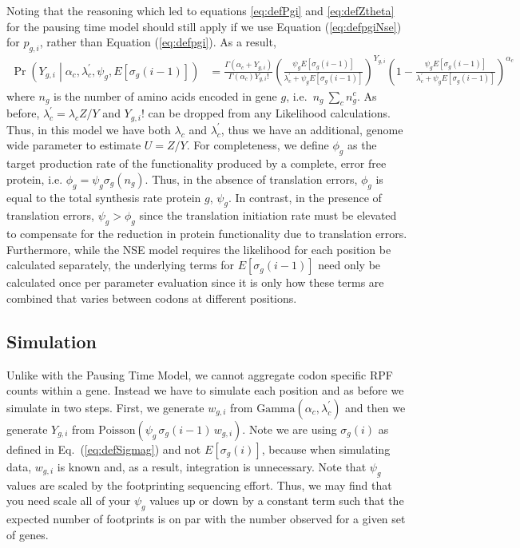 \documentclass{article}
\newcommand{\waitTerm}{\ensuremath{w}\xspace}
\newcommand{\wgi}{\ensuremath{\waitTerm_{g,i}}\xspace}
\newcommand{\WaitTerm}{\ensuremath{w}\xspace} %
\newcommand{\Wgi}{\ensuremath{\WaitTerm_{g,i}}\xspace}
\newcommand{\alphac}{\ensuremath{{\alpha_c}}\xspace}
\newcommand{\lambdac}{\ensuremath{{\lambda_c}}\xspace}
\newcommand{\lambdacprime}{\ensuremath{{\lambda_c^\prime}}\xspace}
\newcommand{\sigmag}{\ensuremath{\sigma_{g}}\xspace}
\newcommand{\sigmagi}{\ensuremath{\sigma_{g}(i)}\xspace}
\newcommand{\Esigmagi}{\ensuremath{E\left[\sigma_{g}(i)\right]}\xspace}
\newcommand{\Esigmagimone}{\ensuremath{E\left[\sigma_{g}(i-1)\right]}\xspace}
\newcommand{\pgi}{\ensuremath{{p_{g,i}}}\xspace}
\newcommand{\ngc}{\ensuremath{{n_{g}^c}}\xspace}
\renewcommand{\ng}{\ensuremath{{n_{g}}}\xspace}
\newcommand{\psig}{\ensuremath{{\psi_g}}\xspace}
\newcommand{\phig}{\ensuremath{{\phi_g}}\xspace}
\newcommand{\Ztheta}{\ensuremath{{Z}}\xspace}
\newcommand{\Ytotal}{\ensuremath{{Y}}\xspace}
\newcommand{\Ygi}{\ensuremath{{Y_{g,i}}}\xspace}
\begin{document}
Noting that the reasoning which led to equations \ref{eq:defPgi} and \ref{eq:defZtheta} for the pausing time model should still apply if we use Equation (\ref{eq:defpgiNse}) for \pgi, rather than Equation (\ref{eq:defpgi}). 
As a result,
\begin{align}
  \label{eq:distYgSiteNse}
  \Pr\left(\Ygi \middle| \alphac, \lambdacprime, \psig, \Esigmagimone\right) 
  &= \frac{\Gamma\left(\alphac + \Ygi\right)}{\Gamma\left(\alphac\right) \Ygi!} 
  \left(\frac{\psig \Esigmagimone}{\lambdacprime + \psig \Esigmagimone}\right)^\Ygi \left(1-\frac{\psig\Esigmagimone}{\lambdacprime + \psig \Esigmagimone}\right)^\alphac
\end{align}
where \ng is the number of amino acids encoded in gene $g$, i.e.~$\ng \ \sum_c \ngc$.
As before, $\lambdacprime = \lambdac \Ztheta/\Ytotal$ and $\Ygi!$ can be dropped from any Likelihood calculations.
Thus, in this model we have both $\lambdac$ and $\lambdacprime$, thus we have an additional, genome wide parameter to estimate $U = \Ztheta/\Ytotal$.
For completeness, we  define $\phig$ as the target production rate of the functionality produced by a complete, error free protein, i.e. $\phig = \psig \sigmag(\ng)$.
Thus, in the absence of translation errors, $\phig$ is equal to the total synthesis rate protein $g$, $\psig$.
In contrast, in the presence of translation errors, $\psig > \phig$ since the translation initiation rate must be elevated to compensate for the reduction in protein functionality due to translation errors.
Furthermore, while the NSE model requires the likelihood for each position be calculated separately, the underlying terms for $\Esigmagimone$ need only be calculated once per parameter evaluation since it is only how these terms are combined that varies between codons at different positions.



\subsection*{Simulation}
Unlike with the Pausing Time Model, we cannot aggregate codon specific RPF counts within a gene.
Instead we have to simulate each position and as before we simulate in two steps.
First, we generate $\Wgi$  from $\text{Gamma}(\alphac, \lambdacprime)$ and then we generate $\Ygi$ from $\text{Poisson}\left(\psi_g \, \sigmag(i-1)\, \Wgi\right)$.
Note we are using $\sigmagi$ as defined in Eq.~(\ref{eq:defSigmag}) and not $\Esigmagi$, because when simulating data, $\wgi$ is known and, as a result, integration is unnecessary.
Note that $\psig$ values are scaled by the footprinting sequencing effort.
Thus, we may find that you need scale all of your $\psig$ values up or down by a constant term such that the expected number of footprints is on par with the number observed for a given set of genes.
\end{document}
